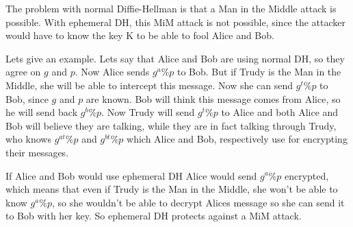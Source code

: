 The problem with normal Diffie-Hellman is that a Man in the Middle attack is possible. With ephemeral DH, this MiM attack is not possible, since the attacker would have to know the key K to be able to fool Alice and Bob. 

Lets give an example. Lets say that Alice and Bob are using normal DH, so they agree on $g$ and $p$. Now Alice sends $g^a \% p$ to Bob. But if Trudy is the Man in the Middle, she will be able to intercept this message. Now she can send $g^t \% p$ to Bob, since $g$ and $p$ are known. Bob will think this message comes from Alice, so he will send back $g^b \% p$. Now Trudy will send $g^t \% p$ to Alice and both Alice and Bob will believe they are talking, while they are in fact talking through Trudy, who knows $g^{at} \% p$ and $g^{bt} \% p$ which Alice and Bob, respectively use for encrypting their messages. 

If Alice and Bob would use ephemeral DH Alice would send $g^a \% p$ encrypted, which means that even if Trudy is the Man in the Middle, she won't be able to know $g^a \% p$, so she wouldn't be able to decrypt Alices message so she can send it to Bob with her key. So ephemeral DH protects against a MiM attack. 